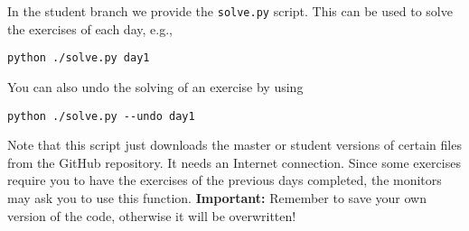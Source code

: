 In the student branch we provide the \verb+solve.py+ script. This can be used
to solve the exercises of each day, e.g.,

\begin{verbatim}
python ./solve.py day1
\end{verbatim}

\noindent You can also undo the solving of an exercise by using

\begin{verbatim}
python ./solve.py --undo day1
\end{verbatim}

Note that this script just downloads the master or student versions of certain files from the GitHub repository. It needs an Internet connection. Since some exercises require you to have the exercises of the previous days completed, the monitors may ask you to use this function. \textbf{Important:} Remember to save your own version of the code, otherwise it will be overwritten!
